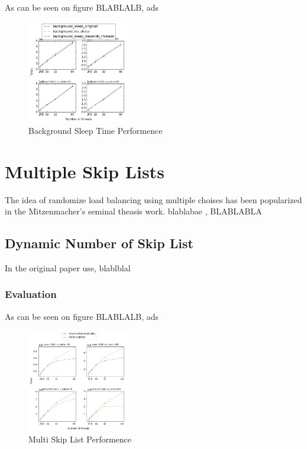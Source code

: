 \documentclass{article}
\begin{document}
As can be seen on figure BLABLALB, ads

\begin{figure}
	\caption{Background Sleep Time Performence}
	\centering
	\includegraphics[width=0.4\textwidth]{sleep_plot}
\end{figure}


\section{Multiple Skip Lists}
\label{sec:msl}

The idea of randomize load balancing using multiple choises has been popularized in the Mitzenmacher's seminal theasis work\cite{C5}. blablabae , BLABLABLA

\subsection{Dynamic Number of Skip List}
\label{ssec:dsrs}

In the original paper use, blablblal

\subsubsection{Evaluation}
\label{sssec:dsrs-evl}

As can be seen on figure BLABLALB, ads

\begin{figure}
	\caption{Multi Skip List Performence}
	\centering
	\includegraphics[width=0.4\textwidth]{many-skiplists_plot}
\end{figure}
\end{document}
